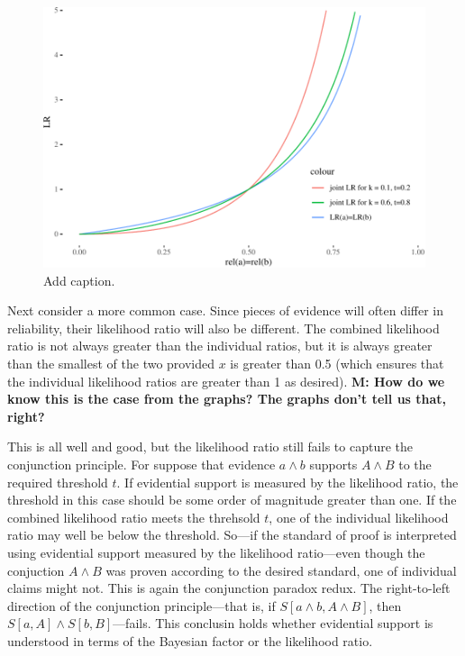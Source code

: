 \documentclass[10pt,dvipsnames,enabledeprecatedfontcommands]{scrartcl}
\newcommand{\et}{\wedge}
\begin{document}
\begin{figure}


\begin{center}\includegraphics[width=0.9\linewidth]{burden-proof3_files/figure-latex/unnamed-chunk-1-1} \end{center}

\label{fig:jointLRMarcello}
\caption{Add caption.}
\end{figure}

\noindent Next consider a more common case. Since pieces of evidence
will often differ in reliability, their likelihood ratio will also be
different. The combined likelihood ratio is not always greater than the
individual ratios, but it is always greater than the smallest of the two
provided \(x\) is greater than 0.5 (which ensures that the individual
likelihood ratios are greater than 1 as desired).
\textbf{M: How do we know this is the case from the graphs? 
The graphs don't tell us that, right?}


This is all well and good, but the likelihood ratio still fails to
capture the conjunction principle. For suppose that evidence \(a \et b\)
supports \(A \et B\) to the required threshold \(t\). If evidential
support is measured by the likelihood ratio, the threshold in this case
should be some order of magnitude greater than one. If the combined
likelihood ratio meets the threhsold \(t\), one of the individual
likelihood ratio may well be below the threshold. So---if the standard
of proof is interpreted using evidential support measured by the
likelihood ratio---even though the conjuction \(A \et B\) was proven
according to the desired standard, one of individual claims might not.
This is again the conjunction paradox redux. The right-to-left direction
of the conjunction principle---that is, if \(S[a \et b, A \et B]\), then
\(S[a, A] \et S[b, B]\)---fails. This conclusin holds whether evidential
support is understood in terms of the Bayesian factor or the likelihood
ratio.
\end{document}
